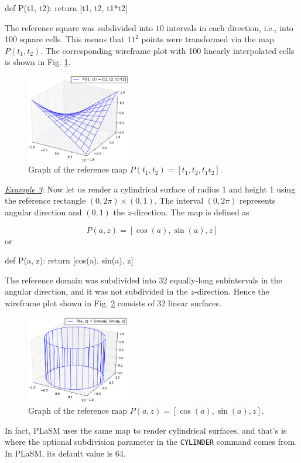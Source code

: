 \begin{bbox}
def P(t1, t2):
    return [t1, t2, t1*t2]
\end{bbox}
The reference square was subdivided into $10$ intervals in each direction, i.e., into 
100 square cells. This means that $11^2$ points were transformed via the map $P(t_1, t_2)$.
The corresponding wireframe plot with 100 linearly interpolated cells is shown in Fig. \ref{fig:paramsu1c}. 

\begin{figure}[!ht]
\begin{center}
\includegraphics[width=0.4\textwidth]{img/paramsu1c.png}
\end{center}
\vspace{-6mm}
\caption{Graph of the reference map $P(t_1, t_2) = [t_1, t_2, t_1 t_2]$.}
\label{fig:paramsu1c}
\end{figure}
\noindent
\noindent
\underline{\em Example 3}: Now let us render a cylindrical surface 
of radius 1 and height 1 using the reference rectangle $(0, 2\pi)\times(0, 1)$. 
The interval $(0, 2\pi)$ represents angular direction and $(0, 1)$ the $z$-direction. 
The map is defined as

$$
P(a, z) = [\cos(a), \sin(a), z]
$$
or

\begin{bbox}
def P(a, z):
    return [cos(a), sin(a), z]
\end{bbox}
The reference domain was subdivided into 32 equally-long subintervals in the angular direction,
and it was not subdivided in the $z$-direction. Hence the wireframe plot shown in 
Fig. \ref{fig:paramsu20} consists of 32 linear surfaces. 
\newpage
\begin{figure}[!ht]
\begin{center}
\includegraphics[width=0.4\textwidth]{img/paramsu20.png}
\end{center}
\vspace{-6mm}
\caption{Graph of the reference map $P(a, z) = [\cos(a), \sin(a), z]$.}
\label{fig:paramsu20}
\end{figure}
\noindent
In fact, PLaSM uses the same map to render cylindrical surfaces, and that's
is where the optional subdivision parameter in the {\tt CYLINDER} command comes from.
In PLaSM, its default value is 64. 

